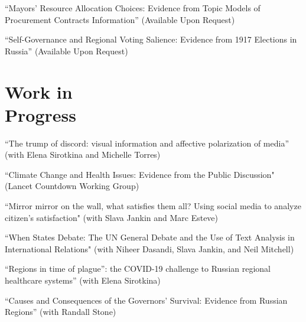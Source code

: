 \documentclass[margin,line,11pt]{res}
\begin{document}
\begin{resume}
\vspace*{-2.5mm}

``Mayors’ Resource Allocation Choices: Evidence from Topic Models of Procurement
Contracts Information'' (Available Upon Request)

\vspace*{-2.5mm}

``Self-Governance and Regional Voting Salience: Evidence from 1917 Elections in Russia'' (Available Upon Request)

\section{\sc Work in \\ Progress}
``The trump of discord: visual information and affective polarization of media'' (with Elena Sirotkina and Michelle Torres)

\vspace*{-3.5mm}
``Climate Change and Health Issues: Evidence from the Public Discussion" (Lancet Countdown Working Group)

\vspace*{-3.5mm}
``Mirror mirror on the wall, what satisfies them all? Using social media to analyze citizen’s satisfaction" (with Slava Jankin and Marc Esteve)

\vspace*{-3.5mm}
``When States Debate: The UN General Debate and the Use of Text Analysis in International Relations" (with Niheer Dasandi, Slava Jankin, and Neil Mitchell)

\vspace*{-3.5mm}
``Regions in time of plague”: the COVID-19 challenge to Russian regional healthcare systems'' (with Elena Sirotkina) 

\vspace*{-3.5mm}
``Causes and Consequences of the Governors' Survival: Evidence from Russian Regions'' (with Randall Stone)







\end{resume}
\end{document}

